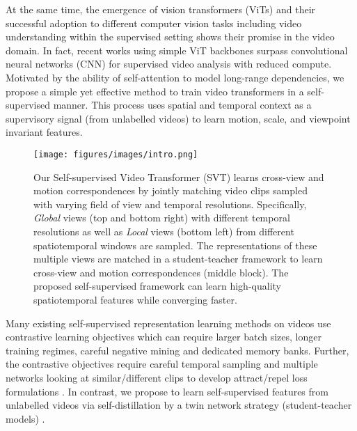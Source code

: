 \documentclass[10pt,twocolumn,letterpaper]{article}
\begin{document}
At the same time, the emergence of vision transformers (ViTs) \cite{dosovitskiy2020image} and their successful adoption to different computer vision tasks including video understanding \cite{gberta_2021_ICML, liu2021video, Ryoo2021TokenLearnerWC, sharir2021image, arnab2021vivit, fan2021multiscale} within the supervised setting shows their promise in the video domain. In fact, recent works using simple ViT backbones \cite{gberta_2021_ICML} surpass convolutional neural networks (CNN) for supervised video analysis with reduced compute. Motivated by the ability of self-attention to model long-range dependencies, we propose a simple yet effective method to train video transformers \cite{gberta_2021_ICML} in a self-supervised manner. This process uses spatial and temporal context as a supervisory signal (from unlabelled videos) to learn motion, scale, and viewpoint invariant features. 

\begin{figure}[t]
    \centering
    \texttt{[image: figures/images/intro.png]}
\caption{Our Self-supervised Video Transformer (SVT) learns cross-view and motion correspondences by jointly matching video clips sampled with varying field of view and temporal resolutions. Specifically, \emph{Global} views (top and bottom right) with different temporal resolutions as well as \emph{Local} views (bottom left) from different spatiotemporal windows are sampled. The representations of these multiple views are matched in a student-teacher framework to learn cross-view and motion correspondences (middle block). The proposed self-supervised framework can learn high-quality spatiotemporal features while converging faster.}
    \label{fig:intro}
    \vspace{-1em}
\end{figure} 
Many existing self-supervised representation learning methods on videos \cite{xie2016unsupervised, recasens2021broaden, qian2020spatiotemporal}  use contrastive learning objectives which can require larger batch sizes, longer training regimes, careful negative mining and dedicated memory banks. Further, the contrastive objectives require careful temporal sampling \cite{qian2020spatiotemporal} and multiple networks looking at similar/different clips to develop attract/repel loss formulations \cite{recasens2021broaden}. In contrast, we propose to learn self-supervised features from unlabelled videos via self-distillation \cite{tarvainen2017mean} by a twin network strategy (student-teacher models) \cite{grill2020bootstrap, caron2021emerging}.  
\end{document}
